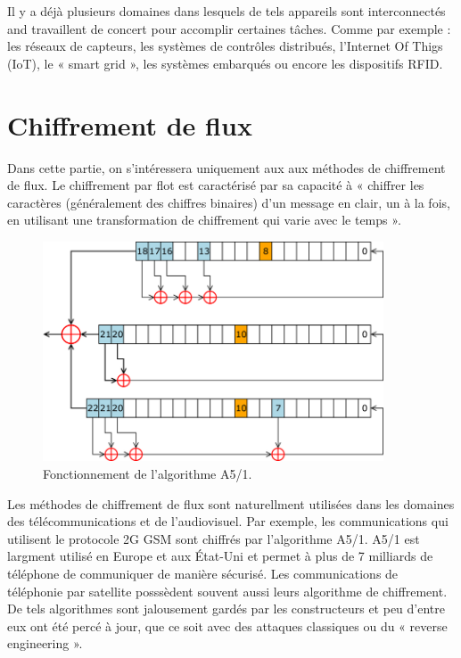 			Il y a déjà plusieurs domaines dans lesquels de tels appareils sont interconnectés and travaillent de concert pour accomplir certaines tâches.
			Comme par exemple : les réseaux de capteurs, les systèmes de contrôles distribués, l'Internet Of Thigs (IoT), le « smart grid », les systèmes embarqués ou encore les dispositifs RFID.
			
			\section{Chiffrement de flux}
			
			Dans cette partie, on s'intéressera uniquement aux aux méthodes de chiffrement de flux.
			Le chiffrement par flot est caractérisé par sa capacité à « chiffrer les caractères (généralement des chiffres binaires) d'un message en clair, un à la fois,
			en utilisant une transformation de chiffrement qui varie avec le temps »\cite{appliedCrypto}.
			
			\begin{figure}[!h]
				\centering
				\includegraphics[width=0.9\textwidth]{imgs/application/A5.png}
				\caption{Fonctionnement de l'algorithme A5/1.}
				\label{algoA5}
			\end{figure}
			
			Les méthodes de chiffrement de flux sont naturellment utilisées dans les domaines des télécommunications et de l'audiovisuel.
			Par exemple, les communications qui utilisent le protocole 2G GSM sont chiffrés par l'algorithme A5/1.
			A5/1 est largment utilisé en Europe et aux État-Uni et permet à plus de 7 milliards de téléphone de communiquer de manière sécurisé\cite{7milliards}.
			Les communications de téléphonie par satellite posssèdent souvent aussi leurs algorithme de chiffrement.
			De tels algorithmes sont jalousement gardés par les constructeurs et peu d'entre eux ont été percé à jour, que ce soit avec des attaques classiques ou du « reverse engineering ».
			

